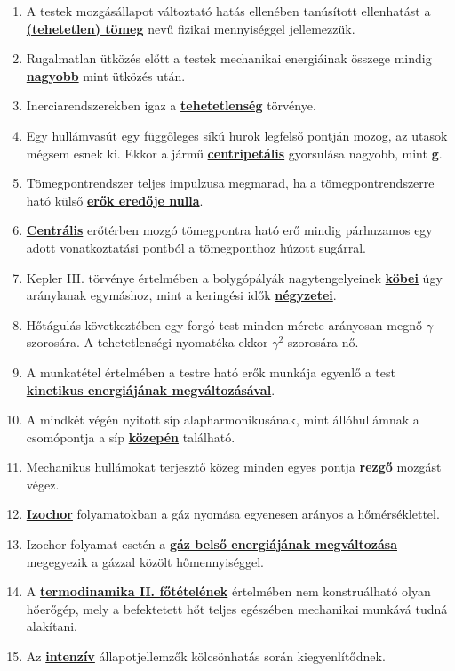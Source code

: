 \documentclass[../../fizika_kerdesek.tex]{subfiles}
\begin{document}
        \begin{enumerate}
            \item A testek mozgásállapot változtató hatás ellenében tanúsított ellenhatást a \underline{\textbf{(tehetetlen) tömeg}} nevű fizikai mennyiséggel jellemezzük.
            \item Rugalmatlan ütközés előtt a testek mechanikai energiáinak összege mindig \underline{\textbf{nagyobb}} mint ütközés után.
            \item Inerciarendszerekben igaz a \underline{\textbf{tehetetlenség}} törvénye.
            \item Egy hullámvasút egy függőleges síkú hurok legfelső pontján mozog, az utasok mégsem esnek ki. Ekkor a jármű \underline{\textbf{centripetális}} gyorsulása nagyobb, mint \underline{\textbf{g}}.
            \item Tömegpontrendszer teljes impulzusa megmarad, ha a tömegpontrendszerre ható külső \underline{\textbf{erők eredője nulla}}.
            \item \underline{\textbf{Centrális}} erőtérben mozgó tömegpontra ható erő mindig párhuzamos egy adott vonatkoztatási pontból a tömegponthoz húzott sugárral.
            \item Kepler III. törvénye értelmében a bolygópályák nagytengelyeinek \underline{\textbf{köbei}} úgy aránylanak egymáshoz, mint a keringési idők \underline{\textbf{négyzetei}}.
            \item Hőtágulás következtében egy forgó test minden mérete arányosan megnő $\gamma$-szorosára. A tehetetlenségi nyomatéka ekkor \underline{\textbf{$\gamma^2$}} szorosára nő.
            \sloppy\item A munkatétel értelmében a testre ható erők munkája egyenlő a test \underline{\textbf{kinetikus energiájának megváltozásával}}.
            \item A mindkét végén nyitott síp alapharmonikusának, mint állóhullámnak a csomópontja a síp \underline{\textbf{közepén}} található.
            \item Mechanikus hullámokat terjesztő közeg minden egyes pontja \underline{\textbf{rezgő}} mozgást végez.
            \item \underline{\textbf{Izochor}} folyamatokban a gáz nyomása egyenesen arányos a hőmérséklettel.
            \item Izochor folyamat esetén a \underline{\textbf{gáz belső energiájának megváltozása}} megegyezik a gázzal közölt hőmennyiséggel.
            \item A \underline{\textbf{termodinamika II. főtételének}} értelmében nem konstruálható olyan hőerőgép, mely a befektetett hőt teljes egészében mechanikai munkává tudná alakítani.
            \item Az \underline{\textbf{intenzív}} állapotjellemzők kölcsönhatás során kiegyenlítődnek.
        \end{enumerate}


    \underline{\textbf{}}
\end{document}
